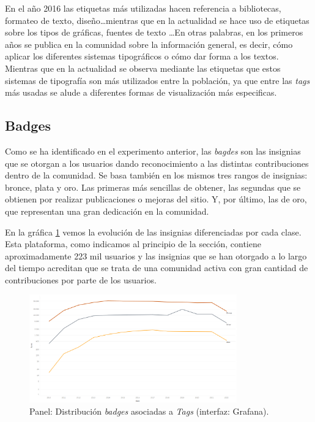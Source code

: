\documentclass[a4paper, 12pt]{book}
\begin{document}
En el año 2016 las etiquetas más utilizadas hacen referencia a bibliotecas, formateo de texto, diseño\ldots mientras que en la actualidad se hace uso de etiquetas sobre los tipos de gráficas, fuentes de texto \ldots En otras palabras, en los primeros años se publica en la comunidad sobre la información general, es decir, cómo aplicar los diferentes sistemas tipográficos o cómo dar forma a los textos. Mientras que en la actualidad se observa mediante las etiquetas que estos sistemas de tipografía son más utilizados entre la población, ya que entre las \emph{tags} más usadas se alude a diferentes formas de visualización más especificas.




\subsection{Badges}

Como se ha identificado en el experimento anterior, las \emph{bagdes} son las insignias que se otorgan a los usuarios dando reconocimiento a las distintas contribuciones dentro de la comunidad. 
Se basa también en los mismos tres rangos de insignias: bronce, plata y oro. Las primeras más sencillas de obtener, las segundas que se obtienen por realizar publicaciones o mejoras del sitio. Y, por último, las de oro, que representan una gran dedicación en la comunidad. 

En la gráfica \ref{figura:badges_tex} vemos la evolución de las insignias diferenciadas por cada clase. Esta plataforma, como indicamos al principio de la sección, contiene aproximadamente 223 mil usuarios y las insignias que se han otorgado a lo largo del tiempo acreditan que se trata de una comunidad activa con gran cantidad de contribuciones por parte de los usuarios. 

\begin{figure}[ht]
    \centering
    \includegraphics[width=0.8\textwidth]{img/tex/badges_tex.png}
    \caption{Panel: Distribución \emph{badges} asociadas a \emph{Tags} (interfaz: Grafana).}
    \label{figura:badges_tex}
\end{figure}
\end{document}
